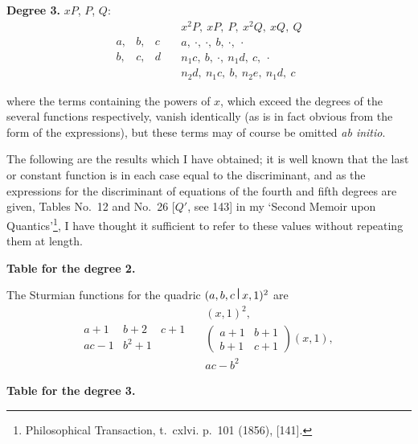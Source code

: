 \documentclass[11pt,a4paper]{book}
\begin{document}
\begin{center}
\medskip

\noindent\textbf{Degree 3.} $xP$, $P$, $Q$:
\[
\begin{array}{ccc}
a, & b, & c \\
b, & c, & d
\end{array}
\quad
\begin{array}{c}
x^2P,\ xP,\ P,\ x^2Q,\ xQ,\ Q \\
a,\ \cdot,\ \cdot,\ b,\ \cdot,\ \cdot \\
n_1 c,\ b,\ \cdot,\ n_1 d,\ c,\ \cdot \\
n_2 d,\ n_1 c,\ b,\ n_2 e,\ n_1 d,\ c
\end{array}
\]

where the terms containing the powers of $x$, which exceed the degrees of the several functions respectively, vanish identically (as is in fact obvious from the form of the expressions), but these terms may of course be omitted \textit{ab initio}.

\medskip

The following are the results which I have obtained; it is well known that the last or constant function is in each case equal to the discriminant, and as the expressions for the discriminant of equations of the fourth and fifth degrees are given, Tables No.~12 and No.~26 [$Q'$, see 143] in my `Second Memoir upon Quantics'\footnote{Philosophical Transaction, t.~cxlvi. p.~101 (1856), [141].}, I have thought it sufficient to refer to these values without repeating them at length.

\bigskip
\noindent\textbf{Table for the degree 2.}

The Sturmian functions for the quadric $(a,b,c\,\raisebox{0.5ex}{\textbf{\textbar}}\,x,1)^2$ are
\[
\begin{array}{c|c|c}
a+1 & b+2 & c+1 \\ \hline
ac-1 & b^2+1 & 
\end{array}
\quad
\begin{array}{c}
(x,1)^2, \\
\begin{pmatrix} a+1 & b+1 \\ b+1 & c+1 \end{pmatrix}(x,1), \\
ac-b^2
\end{array}
\]

\bigskip
\noindent\textbf{Table for the degree 3.}


\end{center}
\end{document}
